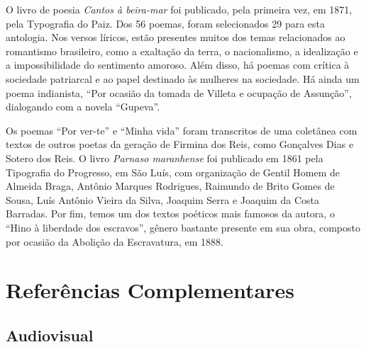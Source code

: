 \documentclass[12pt]{extarticle}
\begin{document}
O livro de poesia \emph{Cantos à beira-mar} foi publicado, pela primeira
vez, em 1871, pela Typografia do Paiz. Dos 56 poemas, foram selecionados
29 para esta antologia. Nos versos líricos, estão presentes muitos dos
temas relacionados ao romantismo brasileiro, como a exaltação da terra,
o nacionalismo, a idealização e a impossibilidade do sentimento amoroso.
Além disso, há poemas com crítica à sociedade patriarcal e ao papel
destinado às mulheres na sociedade. Há ainda um poema indianista, ``Por
ocasião da tomada de Villeta e ocupação de Assunção'', dialogando com a
novela ``Gupeva''.

Os poemas ``Por ver-te'' e ``Minha vida'' foram transcritos de uma
coletânea com textos de outros poetas da geração de Firmina dos Reis,
como Gonçalves Dias e Sotero dos Reis. O livro \emph{Parnaso maranhense}
foi publicado em 1861 pela Tipografia do Progresso, em São Luís, com
organização de Gentil Homem de Almeida Braga, Antônio Marques Rodrigues,
Raimundo de Brito Gomes de Sousa, Luís Antônio Vieira da Silva, Joaquim
Serra e Joaquim da Costa Barradas. Por fim, temos um dos textos poéticos
mais famosos da autora, o ``Hino à liberdade dos escravos'', gênero
bastante presente em sua obra, composto por ocasião da Abolição da
Escravatura, em 1888.

\section{Referências Complementares}

\subsection{Audiovisual}
\end{document}
